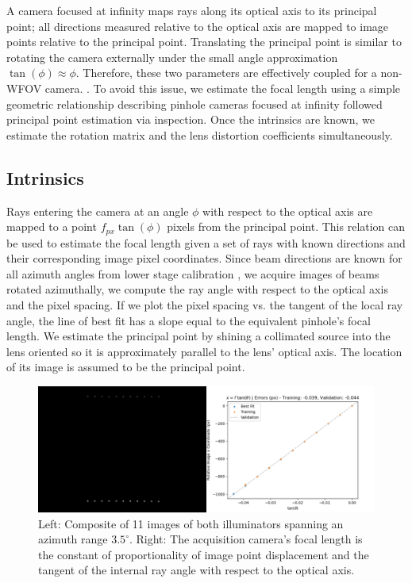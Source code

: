 A camera focused at infinity maps rays along its optical axis to its principal point; all directions measured relative to the optical axis are mapped to image points relative to the principal point. Translating the principal point is similar to rotating the camera externally under the small angle approximation $\tan(\phi) \approx \phi$. Therefore, these two parameters are effectively coupled for a non-WFOV camera. . To avoid this issue, we estimate the focal length using a simple geometric relationship describing pinhole cameras focused at infinity followed principal point estimation via inspection. Once the intrinsics are known, we estimate the rotation matrix and the lens distortion coefficients simultaneously.

\subsection{Intrinsics}
Rays entering the camera at an angle $\phi$ with respect to the optical axis are mapped to a point $f_{px} \tan(\phi)$ pixels from the principal point. This relation can be used to estimate the focal length given a set of rays with known directions and their corresponding image pixel coordinates. Since beam directions are known for all azimuth angles from lower stage calibration , we acquire images of beams rotated azimuthally, we compute the ray angle with respect to the optical axis and the pixel spacing. If we plot the pixel spacing vs. the tangent of the local ray angle, the line of best fit has a slope equal to the equivalent pinhole's focal length. We estimate the principal point by shining a collimated source into the lens oriented so it is approximately parallel to the lens' optical axis. The location of its image is assumed to be the principal point.
\begin{figure}
    \centering
    \includegraphics[width=0.75\linewidth]{../figures/focal_length_estimate.png}
    \caption{Left: Composite of 11 images of both illuminators spanning an azimuth range $3.5^\circ$. Right: The acquisition camera's focal length is the constant of proportionality of image point displacement and the tangent of the internal ray angle with respect to the optical axis.}
    \label{fig:focal_length_estimate}
\end{figure}

